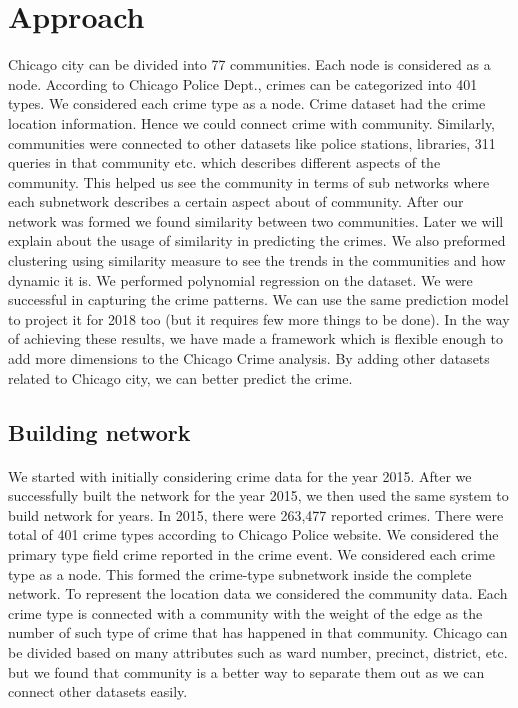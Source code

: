 \documentclass{article}
\begin{document}
\section{Approach}
Chicago city can be divided into 77 communities. Each node is considered as a node. According to Chicago Police Dept., crimes can be categorized into 401 types. We considered each crime type as a node. Crime dataset had the crime location information. Hence we could connect crime with community. Similarly, communities were connected to other datasets like police stations, libraries, 311 queries in that community etc. which describes different aspects of the community. This helped us see the community in terms of sub networks where each subnetwork describes a certain aspect about of community. After our network was formed we found similarity between two communities. Later we will explain about the usage of similarity in predicting the crimes. We also preformed clustering using similarity measure to see the trends in the communities and how dynamic it is. We performed polynomial regression on the dataset. We were successful in capturing the crime patterns. We can use the same prediction model to project it for 2018 too (but it requires few more things to be done). In the way of achieving these results, we have made a framework which is flexible enough to add more dimensions to the Chicago Crime analysis. By adding other datasets related to Chicago city, we can better predict the crime.

\subsection{Building network}
\paragraph{}
We started with initially considering crime data for the year 2015. After we successfully built the network for the year 2015,  we then used the same system to build network for years. In 2015, there were 263,477 reported crimes. There were total of 401 crime types according to Chicago Police website\cite{police}. We considered the primary type field crime reported in the crime event. We considered each crime type as a node. This formed the crime-type subnetwork inside the complete network. To represent the location data we considered the community data. Each crime type is connected with a community with the weight of the edge as the number of such type of crime that has happened in that community. Chicago can be divided based on many attributes such as ward number, precinct, district, etc. but we found that community is a better way to separate them out as we can connect other datasets easily.
\end{document}
